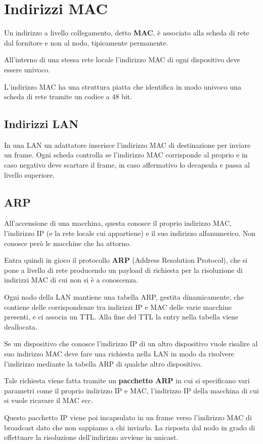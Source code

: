 \section{Indirizzi MAC}
Un indirizzo a livello collegamento, detto \textbf{MAC}, è associato
alla scheda di rete dal fornitore e non al nodo, tipicamente 
permanente.

All'interno di una stessa rete locale l'indirizzo MAC di ogni 
dispositivo deve essere univoco.

L'indirizzo MAC ha una struttura piatta che identifica in modo univoco
una scheda di rete tramite un codice a 48 bit.

\subsection{Indirizzi LAN}
In una LAN un adattatore inserisce l'indirizzo MAC di destinazione per
inviare un frame. Ogni scheda controlla se l'indirizzo MAC corrisponde
al proprio e in caso negativo deve scartare il frame, in caso 
affermativo lo decapsula e passa al livello superiore.

\subsection{ARP}
All'accensione di una macchina, questa conosce il proprio indirizzo 
MAC, l'indirizzo IP (e la rete locale cui appartiene) e il suo 
indirizzo alfanumerico. Non conosce però le macchine che ha attorno.

Entra quindi in gioco il protocollo \textbf{ARP} (Address Resolution
Protocol), che si pone a livello di rete producendo un payload di
richiesta per la risoluzione di indirizzi MAC di cui non si è a 
conoscenza.

Ogni nodo della LAN mantiene una tabella ARP, gestita dinamicamente,
che contiene delle corrispondenze tra indirizzi IP e MAC delle
varie macchine presenti, e ci associa un TTL. Alla fine del TTL 
la entry nella tabella viene deallocata.

Se un dispositivo che conosce l'indirizzo IP di un altro dispositivo
vuole risalire al suo indirizzo MAC deve fare una richiesta nella LAN
in modo da risolvere l'indirizzo mediante la tabella ARP di qualche
altro dispositivo.

Tale richiesta viene fatta tramite un \textbf{pacchetto ARP} in cui
si specificano vari parametri come il proprio indirizzo IP e MAC,
l'indirizzo IP della macchina di cui si vuole ricavare il MAC ecc.

Questo pacchetto IP viene poi incapsulato in un frame verso
l'indirizzo MAC di broadcast dato che non sappiamo a chi inviarlo.
La risposta dal nodo in grado di effettuare la risoluzione 
dell'indirizzo avviene in unicast.
